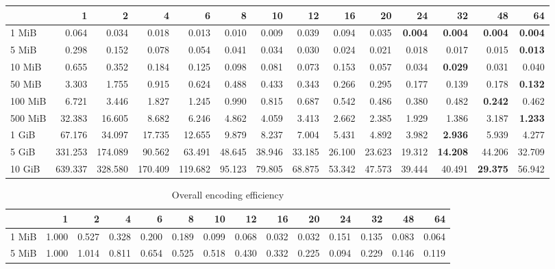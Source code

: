 \begin{centering}
\begin{table}[!h]
\begin{tabular}{lrrrrrrrrrrrrr}
		\diagbox[width=7em]{Size}{Threads}  &      1  &      2  &      4  &      6  &     8  &     10 &     12 &     16 &     20 &     24 &     32 &     48 &     64 \\
		\midrule
		1 MiB   &   0.064 &   0.034 &   0.018 &   0.013 &  0.010 &  0.009 &  0.039 &  0.094 &  0.035 &  \textbf{0.004} &  \textbf{0.004} &  \textbf{0.004} &  \textbf{0.004} \\
		5 MiB   &   0.298 &   0.152 &   0.078 &   0.054 &  0.041 &  0.034 &  0.030 &  0.024 &  0.021 &  0.018 &  0.017 &  0.015 &  \textbf{0.013} \\
		10 MiB  &   0.655 &   0.352 &   0.184 &   0.125 &  0.098 &  0.081 &  0.073 &  0.153 &  0.057 &  0.034 &  \textbf{0.029} &  0.031 &  0.040 \\
		50 MiB  &   3.303 &   1.755 &   0.915 &   0.624 &  0.488 &  0.433 &  0.343 &  0.266 &  0.295 &  0.177 &  0.139 &  0.178 &  \textbf{0.132} \\
		100 MiB &   6.721 &   3.446 &   1.827 &   1.245 &  0.990 &  0.815 &  0.687 &  0.542 &  0.486 &  0.380 &  0.482 &  \textbf{0.242} &  0.462 \\
		500 MiB &  32.383 &  16.605 &   8.682 &   6.246 &  4.862 &  4.059 &  3.413 &  2.662 &  2.385 &  1.929 &  1.386 &  3.187 &  \textbf{1.233} \\
		1 GiB   &  67.176 &  34.097 &  17.735 &  12.655 &  9.879 &  8.237 &  7.004 &  5.431 &  4.892 &  3.982 &  \textbf{2.936} &  5.939 &  4.277 \\
		5 GiB   & 331.253 & 174.089 &  90.562 &  63.491 & 48.645 & 38.946 & 33.185 & 26.100 & 23.623 & 19.312 & \textbf{14.208} & 44.206 & 32.709 \\
		10 GiB  & 639.337 & 328.580 & 170.409 & 119.682 & 95.123 & 79.805 & 68.875 & 53.342 & 47.573 & 39.444 & 40.491 & \textbf{29.375} & 56.942 \\
		\bottomrule
	\end{tabular}
\end{table}
\begin{table}[!h]
	\caption{Overall encoding efficiency}
	\begin{tabular}{lrrrrrrrrrrrrr}
		\toprule
		\diagbox[width=7em]{Size}{Threads} &    1  &    2  &    4  &    6  &    8  &    10 &    12 &    16 &    20 &    24 &    32 &    48 &    64 \\
		\midrule
		1 MiB   & 1.000 & 0.527 & 0.328 & 0.200 & 0.189 & 0.099 & 0.068 & 0.032 & 0.032 & 0.151 & 0.135 & 0.083 & 0.064 \\
		5 MiB   & 1.000 & 1.014 & 0.811 & 0.654 & 0.525 & 0.518 & 0.430 & 0.332 & 0.225 & 0.094 & 0.229 & 0.146 & 0.119 \\

\end{tabular}
\end{table}
\end{centering}
